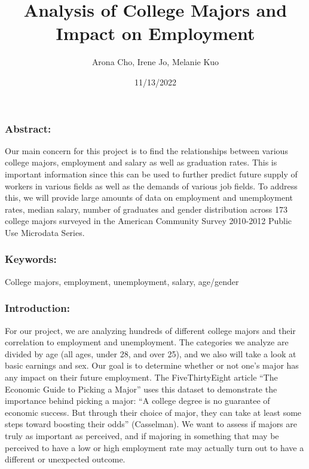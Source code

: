 \documentclass[
]{article}
\title{Analysis of College Majors and Impact on Employment}
\author{Arona Cho, Irene Jo, Melanie Kuo}
\date{11/13/2022}
\begin{document}
\maketitle

\hypertarget{abstract}{%
\subsubsection{Abstract:}\label{abstract}}

Our main concern for this project is to find the relationships between
various college majors, employment and salary as well as graduation
rates. This is important information since this can be used to further
predict future supply of workers in various fields as well as the
demands of various job fields. To address this, we will provide large
amounts of data on employment and unemployment rates, median salary,
number of graduates and gender distribution across 173 college majors
surveyed in the American Community Survey 2010-2012 Public Use Microdata
Series.

\hypertarget{keywords}{%
\subsubsection{Keywords:}\label{keywords}}

College majors, employment, unemployment, salary, age/gender

\hypertarget{introduction}{%
\subsubsection{Introduction:}\label{introduction}}

For our project, we are analyzing hundreds of different college majors
and their correlation to employment and unemployment. The categories we
analyze are divided by age (all ages, under 28, and over 25), and we
also will take a look at basic earnings and sex. Our goal is to
determine whether or not one's major has any impact on their future
employment. The FiveThirtyEight article ``The Economic Guide to Picking
a Major'' uses this dataset to demonstrate the importance behind picking
a major: ``A college degree is no guarantee of economic success. But
through their choice of major, they can take at least some steps toward
boosting their odds'' (Casselman). We want to assess if majors are truly
as important as perceived, and if majoring in something that may be
perceived to have a low or high employment rate may actually turn out to
have a different or unexpected outcome.
\end{document}
